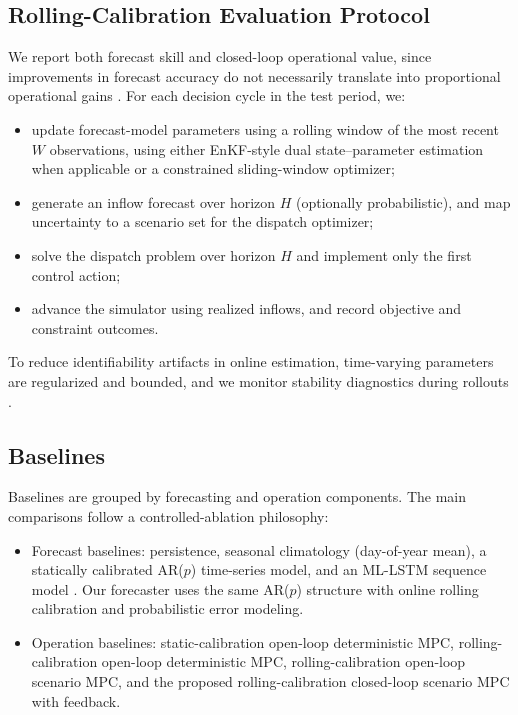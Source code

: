 \documentclass[conference]{IEEEtran}
\begin{document}
\subsection{Rolling-Calibration Evaluation Protocol}
We report both forecast skill and closed-loop operational value, since improvements in forecast
accuracy do not necessarily translate into proportional operational gains \cite{turner2017complex}.
For each decision cycle in the test period, we:
\begin{itemize}[leftmargin=*]
\item update forecast-model parameters using a rolling window of the most recent $W$ observations,
using either EnKF-style dual state--parameter estimation when applicable
\cite{evensen2003ensemble,moradkhani2005dual} or a constrained sliding-window optimizer;
\item generate an inflow forecast over horizon $H$ (optionally probabilistic), and map uncertainty
to a scenario set for the dispatch optimizer;
\item solve the dispatch problem over horizon $H$ and implement only the first control action;
\item advance the simulator using realized inflows, and record objective and constraint outcomes.
\end{itemize}
To reduce identifiability artifacts in online estimation, time-varying parameters are regularized
and bounded, and we monitor stability diagnostics during rollouts
\cite{maxwell2018constraining,xiong2019identifying}.

\subsection{Baselines}
Baselines are grouped by forecasting and operation components. The main comparisons follow a
controlled-ablation philosophy:
\begin{itemize}[leftmargin=*]
\item Forecast baselines: persistence, seasonal climatology (day-of-year mean), a statically calibrated AR($p$)
time-series model, and an ML-LSTM sequence model \cite{kratzert2018rainfall,kratzert2019learning}. Our forecaster
uses the same AR($p$) structure with online rolling calibration and probabilistic error modeling.
\item Operation baselines: static-calibration open-loop deterministic MPC, rolling-calibration open-loop deterministic MPC,
rolling-calibration open-loop scenario MPC, and the proposed rolling-calibration closed-loop scenario MPC with feedback.
\end{itemize}
\end{document}
